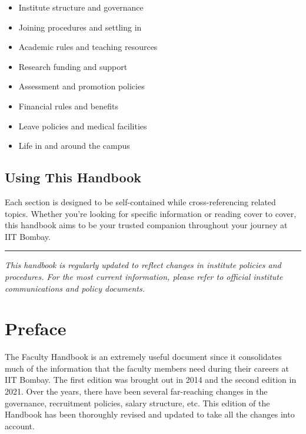 \documentclass[
  10pt,
  a5paper,
  10pt,
  openany]{amsbook}
\providecommand{\tightlist}{%
  \setlength{\itemsep}{0pt}\setlength{\parskip}{0pt}}
\begin{document}
\begin{itemize}
\tightlist
\item
  Institute structure and governance
\item
  Joining procedures and settling in
\item
  Academic rules and teaching resources
\item
  Research funding and support
\item
  Assessment and promotion policies
\item
  Financial rules and benefits
\item
  Leave policies and medical facilities
\item
  Life in and around the campus
\end{itemize}

\section{Using This Handbook}\label{using-this-handbook}

Each section is designed to be self-contained while cross-referencing
related topics. Whether you're looking for specific information or
reading cover to cover, this handbook aims to be your trusted companion
throughout your journey at IIT Bombay.

\begin{center}\rule{0.5\linewidth}{0.5pt}\end{center}

\emph{This handbook is regularly updated to reflect changes in institute
policies and procedures. For the most current information, please refer
to official institute communications and policy documents.}


\chapter*{Preface}\label{preface}


\vspace{-0.9cm}

The Faculty Handbook is an extremely useful document since it
consolidates much of the information that the faculty members need
during their careers at IIT Bombay. The first edition was brought out in
2014 and the second edition in 2021. Over the years, there have been
several far-reaching changes in the governance, recruitment policies,
salary structure, etc. This edition of the Handbook has been thoroughly
revised and updated to take all the changes into account.
\end{document}
